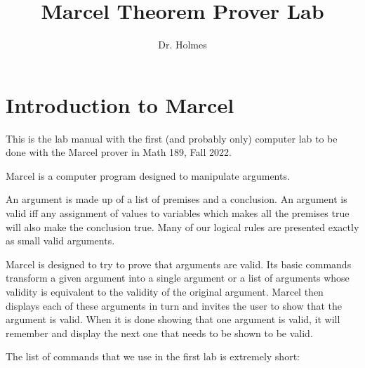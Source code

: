 \documentclass[12pt]{article}
\title{Marcel Theorem Prover Lab}
\author{Dr. Holmes}
\begin{document}
\maketitle

\section{Introduction to Marcel}

This is the lab manual with the first (and probably only) computer lab to be done with the Marcel prover in Math 189, Fall 2022.

Marcel is a computer program designed to manipulate arguments.

An argument is made up of a list of premises and a conclusion.  An argument is valid iff any assignment of values to variables which makes all the premises
true will also make the conclusion true.  Many of our logical rules are presented exactly as small valid arguments.

Marcel is designed to try to prove that arguments are valid.  Its basic commands transform a given argument into a single argument or a list of arguments
whose validity is equivalent to the validity of the original argument.  Marcel then displays each of these arguments in turn and invites the user to show that the argument is valid.  When it is done showing that one argument is valid, it will remember and display the next one that needs to be shown to be valid.

The list of commands that we use in the first lab is extremely short:
\end{document}
